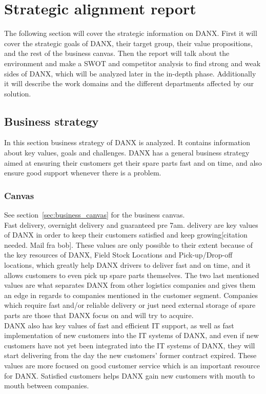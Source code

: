 \chapter{Strategic alignment report}
The following section will cover the strategic information on DANX. First it will cover the strategic goals of DANX, their target group, their value propositions, and the rest of the business canvas. 
Then the report will talk about the environment and make a SWOT and competitor analysis to find strong and weak sides of DANX, which will be analyzed later in the in-depth phase.
Additionally it will describe the work domains and the different departments affected by our solution.

\section{Business strategy}
In this section business strategy of DANX is analyzed. It contains information about key values, goals and challenges.
DANX has a general business strategy aimed at ensuring their customers get their spare parts fast and on time, and also ensure good support whenever there is a problem.

\subsection{Canvas}

See section~\ref{sec:business_canvas} for the business canvas.\\
Fast delivery, overnight delivery and guaranteed pre 7am. delivery are key values of DANX in order to keep their customers satisfied and keep growing[citation needed. Mail fra bob]. These values are only possible to their extent because of the key resources of DANX, Field Stock Locations and Pick-up/Drop-off locations, which greatly help DANX drivers to deliver fast and on time, and it allows customers to even pick up spare parts themselves. The two last mentioned values are what separates DANX from other logistics companies and gives them an edge in regards to companies mentioned in the customer segment. Companies which require fast and/or reliable delivery or just need external storage of spare parts are those that DANX focus on and will try to acquire.\\
DANX also has key values of fast and efficient IT support, as well as fast implementation of new customers into the IT systems of DANX, and even if new customers have not yet been integrated into the IT systems of DANX, they will start delivering from the day the new customers' former contract expired. These values are more focused on good customer service which is an important resource for DANX. Satisfied customers helps DANX gain new customers with mouth to mouth between companies.

